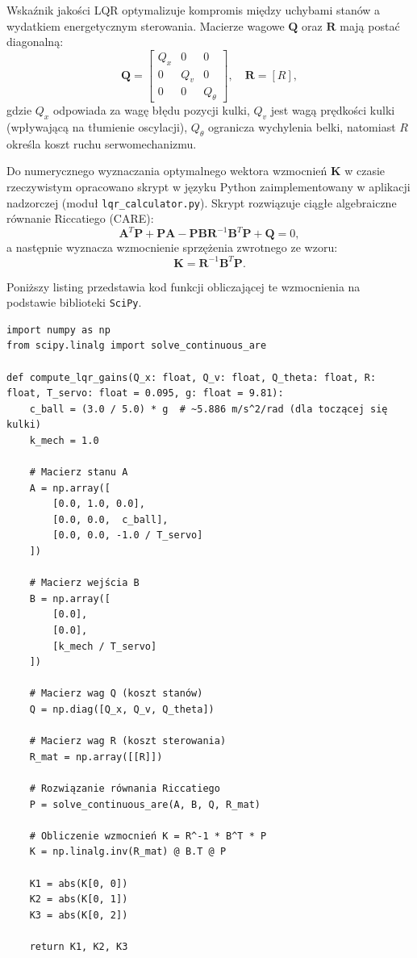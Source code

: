 Wskaźnik jakości LQR optymalizuje kompromis między uchybami stanów a wydatkiem energetycznym sterowania. Macierze wagowe $\mathbf{Q}$ oraz $\mathbf{R}$ mają postać diagonalną:
\begin{equation}
  \mathbf{Q} = \begin{bmatrix} Q_x & 0 & 0 \\ 0 & Q_v & 0 \\ 0 & 0 & Q_{\theta} \end{bmatrix}, \quad \mathbf{R} = [R],
\end{equation}
gdzie $Q_x$ odpowiada za wagę błędu pozycji kulki, $Q_v$ jest wagą prędkości kulki (wpływającą na tłumienie oscylacji), $Q_{\theta}$ ogranicza wychylenia belki, natomiast $R$ określa koszt ruchu serwomechanizmu.

Do numerycznego wyznaczania optymalnego wektora wzmocnień $\mathbf{K}$ w czasie rzeczywistym opracowano skrypt w języku Python zaimplementowany w aplikacji nadzorczej (moduł \texttt{lqr\_calculator.py}). Skrypt rozwiązuje ciągłe algebraiczne równanie Riccatiego (CARE):
\begin{equation}
  \mathbf{A}^T\mathbf{P} + \mathbf{P}\mathbf{A} - \mathbf{P}\mathbf{B}\mathbf{R}^{-1}\mathbf{B}^T\mathbf{P} + \mathbf{Q} = 0,
\end{equation}
a następnie wyznacza wzmocnienie sprzężenia zwrotnego ze wzoru:
\begin{equation}
  \mathbf{K} = \mathbf{R}^{-1}\mathbf{B}^T\mathbf{P}.
\end{equation}

Poniższy listing przedstawia kod funkcji obliczającej te wzmocnienia na podstawie biblioteki \texttt{SciPy}.

\begin{lstlisting}[style=pythonstyle, caption={Obliczanie wzmocnień regulatora LQR (lqr\_calculator.py)}, label={lst:lqr_calc}]
import numpy as np
from scipy.linalg import solve_continuous_are

def compute_lqr_gains(Q_x: float, Q_v: float, Q_theta: float, R: float, T_servo: float = 0.095, g: float = 9.81):
    c_ball = (3.0 / 5.0) * g  # ~5.886 m/s^2/rad (dla toczącej się kulki)
    k_mech = 1.0

    # Macierz stanu A
    A = np.array([
        [0.0, 1.0, 0.0],
        [0.0, 0.0,  c_ball],
        [0.0, 0.0, -1.0 / T_servo]
    ])

    # Macierz wejścia B
    B = np.array([
        [0.0],
        [0.0],
        [k_mech / T_servo]
    ])

    # Macierz wag Q (koszt stanów)
    Q = np.diag([Q_x, Q_v, Q_theta])

    # Macierz wag R (koszt sterowania)
    R_mat = np.array([[R]])

    # Rozwiązanie równania Riccatiego
    P = solve_continuous_are(A, B, Q, R_mat)

    # Obliczenie wzmocnień K = R^-1 * B^T * P
    K = np.linalg.inv(R_mat) @ B.T @ P

    K1 = abs(K[0, 0])
    K2 = abs(K[0, 1])
    K3 = abs(K[0, 2])

    return K1, K2, K3
\end{lstlisting}

